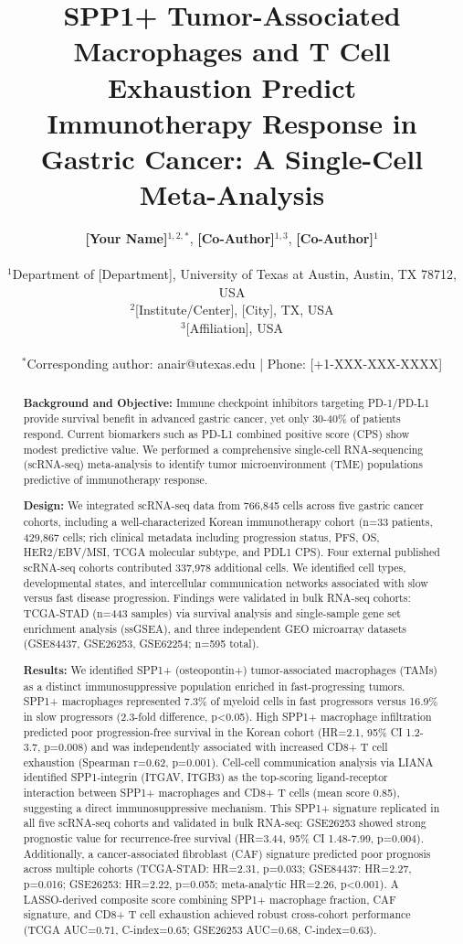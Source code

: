 \documentclass[12pt,twoside]{article}
\title{SPP1+ Tumor-Associated Macrophages and T Cell Exhaustion Predict Immunotherapy Response in Gastric Cancer: A Single-Cell Meta-Analysis}
\author{
    \textbf{[Your Name]}$^{1,2,*}$,
    \textbf{[Co-Author]}$^{1,3}$,
    \textbf{[Co-Author]}$^{1}$ \\
    \\
    $^1$Department of [Department], University of Texas at Austin, Austin, TX 78712, USA \\
    $^2$[Institute/Center], [City], TX, USA \\
    $^3$[Affiliation], USA \\
    \\
    $^*$Corresponding author: anair@utexas.edu | Phone: [+1-XXX-XXX-XXXX]
}
\date{}
\begin{document}
\maketitle


\begin{abstract}

\noindent \textbf{Background and Objective:} Immune checkpoint inhibitors targeting PD-1/PD-L1 provide survival benefit in advanced gastric cancer, yet only 30-40\% of patients respond. Current biomarkers such as PD-L1 combined positive score (CPS) show modest predictive value. We performed a comprehensive single-cell RNA-sequencing (scRNA-seq) meta-analysis to identify tumor microenvironment (TME) populations predictive of immunotherapy response.

\noindent \textbf{Design:} We integrated scRNA-seq data from 766,845 cells across five gastric cancer cohorts, including a well-characterized Korean immunotherapy cohort (n=33 patients, 429,867 cells; rich clinical metadata including progression status, PFS, OS, HER2/EBV/MSI, TCGA molecular subtype, and PDL1 CPS). Four external published scRNA-seq cohorts contributed 337,978 additional cells. We identified cell types, developmental states, and intercellular communication networks associated with slow versus fast disease progression. Findings were validated in bulk RNA-seq cohorts: TCGA-STAD (n=443 samples) via survival analysis and single-sample gene set enrichment analysis (ssGSEA), and three independent GEO microarray datasets (GSE84437, GSE26253, GSE62254; n=595 total).

\noindent \textbf{Results:} We identified SPP1+ (osteopontin+) tumor-associated macrophages (TAMs) as a distinct immunosuppressive population enriched in fast-progressing tumors. SPP1+ macrophages represented 7.3\% of myeloid cells in fast progressors versus 16.9\% in slow progressors (2.3-fold difference, p<0.05). High SPP1+ macrophage infiltration predicted poor progression-free survival in the Korean cohort (HR=2.1, 95\% CI 1.2-3.7, p=0.008) and was independently associated with increased CD8+ T cell exhaustion (Spearman r=0.62, p=0.001). Cell-cell communication analysis via LIANA identified SPP1-integrin (ITGAV, ITGB3) as the top-scoring ligand-receptor interaction between SPP1+ macrophages and CD8+ T cells (mean score 0.85), suggesting a direct immunosuppressive mechanism. This SPP1+ signature replicated in all five scRNA-seq cohorts and validated in bulk RNA-seq: GSE26253 showed strong prognostic value for recurrence-free survival (HR=3.44, 95\% CI 1.48-7.99, p=0.004). Additionally, a cancer-associated fibroblast (CAF) signature predicted poor prognosis across multiple cohorts (TCGA-STAD: HR=2.31, p=0.033; GSE84437: HR=2.27, p=0.016; GSE26253: HR=2.22, p=0.055; meta-analytic HR=2.26, p<0.001). A LASSO-derived composite score combining SPP1+ macrophage fraction, CAF signature, and CD8+ T cell exhaustion achieved robust cross-cohort performance (TCGA AUC=0.71, C-index=0.65; GSE26253 AUC=0.68, C-index=0.63).


\end{abstract}
\end{document}
